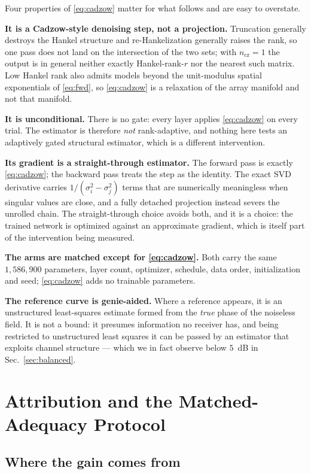 \documentclass[journal]{IEEEtran}
\begin{document}
Four properties of \eqref{eq:cadzow} matter for what follows and are easy to
overstate.

\textbf{It is a Cadzow-style denoising step, not a projection.} Truncation
generally destroys the Hankel structure and re-Hankelization generally raises
the rank, so one pass does not land on the intersection of the two sets; with
$n_{\mathrm{cz}}=1$ the output is in general neither exactly Hankel-rank-$r$
nor the nearest such matrix. Low Hankel rank also admits models beyond the
unit-modulus spatial exponentials of \eqref{eq:fwd}, so \eqref{eq:cadzow} is a
relaxation of the array manifold and not that manifold.

\textbf{It is unconditional.} There is no gate: every layer applies
\eqref{eq:cadzow} on every trial. The estimator is therefore \emph{not}
rank-adaptive, and nothing here tests an adaptively gated structural estimator,
which is a different intervention.

\textbf{Its gradient is a straight-through estimator.} The forward pass is
exactly \eqref{eq:cadzow}; the backward pass treats the step as the identity.
The exact SVD derivative carries $1/(\sigma_i^2-\sigma_j^2)$ terms that are
numerically meaningless when singular values are close, and a fully detached
projection instead severs the unrolled chain. The straight-through choice
avoids both, and it is a choice: the trained network is optimized against an
approximate gradient, which is itself part of the intervention being measured.

\textbf{The arms are matched except for \eqref{eq:cadzow}.} Both carry the same
$1{,}586{,}900$ parameters, layer count, optimizer, schedule, data order,
initialization and seed; \eqref{eq:cadzow} adds no trainable parameters.

\textbf{The reference curve is genie-aided.} Where a reference appears, it is
an unstructured least-squares estimate formed from the \emph{true} phase of
the noiseless field. It is not a bound: it presumes information no receiver
has, and being restricted to unstructured least squares it can be passed by an
estimator that exploits channel structure --- which we in fact observe below
$5$~dB in Sec.~\ref{sec:balanced}.

\section{Attribution and the Matched-Adequacy Protocol}
\label{sec:protocol}

\subsection{Where the gain comes from}
\end{document}

